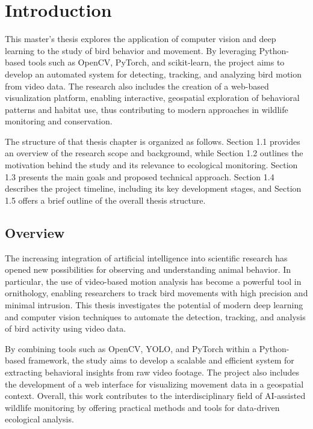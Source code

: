 
\chapter{Introduction}

This master’s thesis explores the application of computer vision and deep learning to the study of bird behavior and movement. By leveraging Python-based tools such as OpenCV, PyTorch, and scikit-learn, the project aims to develop an automated system for detecting, tracking, and analyzing bird motion from video data. The research also includes the creation of a web-based visualization platform, enabling interactive, geospatial exploration of behavioral patterns and habitat use, thus contributing to modern approaches in wildlife monitoring and conservation.
\\
\par The structure of that thesis chapter is organized as follows. Section 1.1 provides an overview of the research scope and background, while Section 1.2 outlines the motivation behind the study and its relevance to ecological monitoring. Section 1.3 presents the main goals and proposed technical approach. Section 1.4 describes the project timeline, including its key development stages, and Section 1.5 offers a brief outline of the overall thesis structure.

\section{Overview}

The increasing integration of artificial intelligence into scientific research has opened new possibilities for observing and understanding animal behavior. In particular, the use of video-based motion analysis has become a powerful tool in ornithology, enabling researchers to track bird movements with high precision and minimal intrusion. This thesis investigates the potential of modern deep learning and computer vision techniques to automate the detection, tracking, and analysis of bird activity using video data.

By combining tools such as OpenCV, YOLO, and PyTorch within a Python-based framework, the study aims to develop a scalable and efficient system for extracting behavioral insights from raw video footage. The project also includes the development of a web interface for visualizing movement data in a geospatial context. Overall, this work contributes to the interdisciplinary field of AI-assisted wildlife monitoring by offering practical methods and tools for data-driven ecological analysis. 

